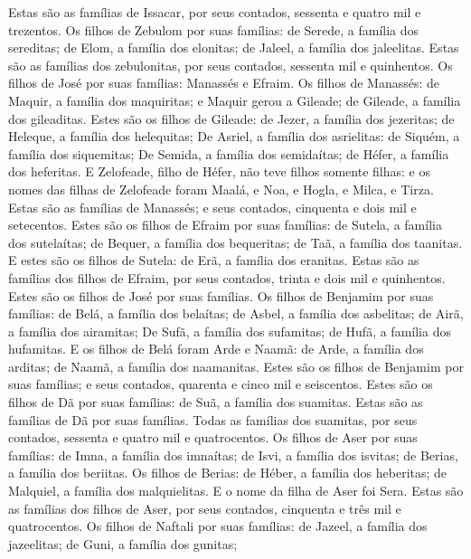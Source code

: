 {  Estas são as famílias de Issacar, por seus contados, sessenta e quatro mil e trezentos.
  Os filhos de Zebulom por suas famílias: de Serede, a família dos sereditas; de Elom, a família dos elonitas; de Jaleel, a família dos jaleelitas.
  Estas são as famílias dos zebulonitas, por seus contados, sessenta mil e quinhentos.
  Os filhos de José por suas famílias: Manassés e Efraim.
  Os filhos de Manassés: de Maquir, a família dos maquiritas; e Maquir gerou a Gileade; de Gileade, a família dos gileaditas.
  Estes são os filhos de Gileade: de Jezer, a família dos jezeritas; de Heleque, a família dos helequitas;
  De Asriel, a família dos asrielitas: de Siquém, a família dos siquemitas;
  De Semida, a família dos semidaítas; de Héfer, a família dos heferitas.
  E Zelofeade, filho de Héfer, não teve filhos somente filhas: e os nomes das filhas de Zelofeade foram Maalá, e Noa, e Hogla, e Milca, e Tirza.
  Estas são as famílias de Manassés; e seus contados, cinquenta e dois mil e setecentos.
  Estes são os filhos de Efraim por suas famílias: de Sutela, a família dos sutelaítas; de Bequer, a família dos bequeritas; de Taã, a família dos taanitas.
  E estes são os filhos de Sutela: de Erã, a família dos eranitas.
  Estas são as famílias dos filhos de Efraim, por seus contados, trinta e dois mil e quinhentos. Estes são os filhos de José por suas famílias.
  Os filhos de Benjamim por suas famílias: de Belá, a família dos belaítas; de Asbel, a família dos asbelitas; de Airã, a família dos airamitas;
  De Sufã, a família dos sufamitas; de Hufã, a família dos hufamitas.
  E os filhos de Belá foram Arde e Naamã: de Arde, a família dos arditas; de Naamã, a família dos naamanitas.
  Estes são os filhos de Benjamim por suas famílias; e seus contados, quarenta e cinco mil e seiscentos.
  Estes são os filhos de Dã por suas famílias: de Suã, a família dos suamitas. Estas são as famílias de Dã por suas famílias.
  Todas as famílias dos suamitas, por seus contados, sessenta e quatro mil e quatrocentos.
  Os filhos de Aser por suas famílias: de Imna, a família dos imnaítas; de Isvi, a família dos isvitas; de Berias, a família dos beriitas.
  Os filhos de Berias: de Héber, a família dos heberitas; de Malquiel, a família dos malquielitas.
  E o nome da filha de Aser foi Sera.
  Estas são as famílias dos filhos de Aser, por seus contados, cinquenta e três mil e quatrocentos.
  Os filhos de Naftali por suas famílias: de Jazeel, a família dos jazeelitas; de Guni, a família dos gunitas;
}
